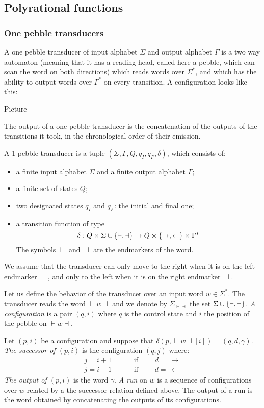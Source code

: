 \subsection{Polyrational functions}

\subsubsection{One pebble transducers}
A one pebble transducer of input alphabet $\Sigma$ and output alphabet $\Gamma$ is a two way automaton (meaning that it has a reading head, called here a pebble, which can scan the word on both directions) which reads words over $\Sigma^*$, and which has the ability to output words over $\Gamma^*$ on every transition. A configuration looks like this:
\begin{center}
Picture
\end{center} 
The output of a one pebble transducer is the concatenation of the outputs of the transitions it took, in the chronological order of their emission.

\begin{definition}\label{def:1pebble}
A 1-pebble transducer is a tuple $(\Sigma,\Gamma, Q, q_I, q_F, \delta)$, which consists of:
\begin{itemize}
\item a finite input alphabet $\Sigma$ and a finite output alphabet $\Gamma$; 
\item a finite set of states $Q$;
\item two designated states $q_I$ and $q_F$: the initial and final one;
\item  a transition function of type 
$$\delta : Q\times \Sigma\cup\{\vdash,\dashv\} \to Q\times\{\rightarrow,\leftarrow\}\times\Gamma^*$$
The symbols  $\vdash$ and $\dashv$ are the endmarkers of the word. 
\end{itemize}
We assume that the transducer can only move to the right when it is on the left endmarker $\vdash$, and only to the left when  it is on the right endmarker $\dashv$.
 \end{definition}


Let us define the behavior of the transducer over an input word $w\in\Sigma^*$. The transducer reads the word ${\vdash} w{\dashv}$ and we denote by $\Sigma_{\vdash\dashv}$ the set  $\Sigma\cup\{\vdash,\dashv\}$. \emph{A configuration} is a pair $(q,i)$ where $q$ is the control state and $i$ the position of the pebble on ${\vdash} w{\dashv}$. 

Let $(p,i)$ be a configuration and suppose that $\delta(p, {\vdash} w{\dashv}[i])=(q,d,\gamma)$. \emph{The successor of $(p,i)$} is the configuration $(q,j)$
where:
\begin{align*}
 j=i+1 &\qquad \text{ if }\qquad d=\ \rightarrow\\
 j=i-1 &\qquad \text{ if }\qquad d=\ \leftarrow 
\end{align*}
\emph{The output of $(p,i)$} is the word $\gamma$. \emph{A run} on $w$ is a sequence of configurations over $w$ related by a the successor relation defined above. The output of a run is the word obtained by concatenating the outputs of its configurations.

